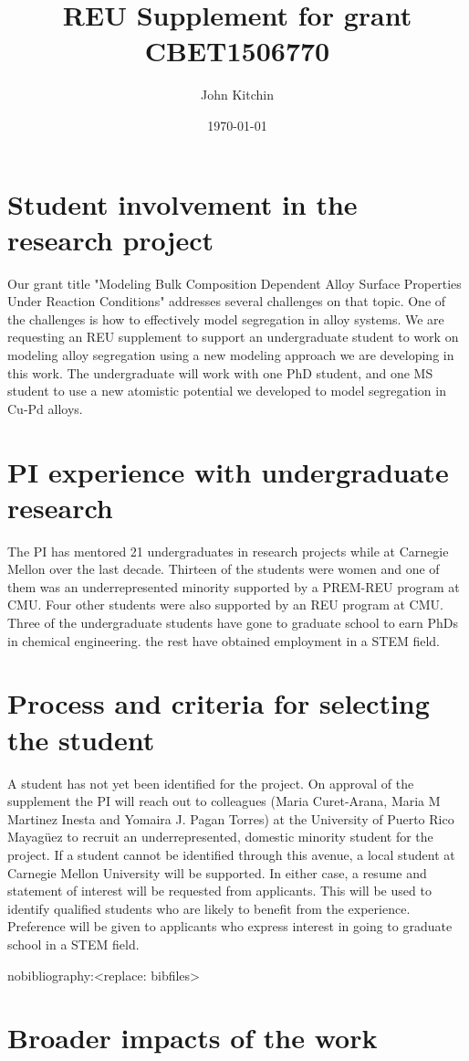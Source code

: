 \documentclass[12pt]{article}
\author{John Kitchin}
\date{\today}
\title{REU Supplement for grant CBET1506770}
\begin{document}
\section{Student involvement in the research project}
\label{sec-1}

Our grant title "Modeling Bulk Composition Dependent Alloy Surface Properties Under Reaction Conditions" addresses several challenges on that topic. One of the challenges is how to effectively model segregation in alloy systems. We are requesting an REU supplement to support an undergraduate student to work on modeling alloy segregation using a new modeling approach we are developing in this work. The undergraduate will work with one PhD student, and one MS student to use a new atomistic potential we developed to model segregation in Cu-Pd alloys.



\section{PI experience with undergraduate research}
\label{sec-2}
The PI has mentored 21 undergraduates in research projects while at Carnegie Mellon over the last decade. Thirteen of the students were women and one of them was an underrepresented minority supported by a PREM-REU program at CMU. Four other students were also supported by an REU program at CMU. Three of the undergraduate students have gone to graduate school to earn PhDs in chemical engineering. the rest have obtained employment in a STEM field.

\section{Process and criteria for selecting the student}
\label{sec-3}

A student has not yet been identified for the project. On approval of the supplement the PI will reach out to colleagues (Maria Curet-Arana, Maria M Martinez Inesta and Yomaira J. Pagan Torres) at the University of Puerto Rico Mayagüez to recruit an underrepresented, domestic minority student for the project. If a student cannot be identified through this avenue, a local student at Carnegie Mellon University will be supported. In either case, a resume and statement of interest will be requested from applicants. This will be used to identify qualified students who are likely to benefit from the experience. Preference will be given to applicants who express interest in going to graduate school in a STEM field.

\newpage


nobibliography:<replace: bibfiles>


\section{Broader impacts of the work}
\label{sec-4}
\end{document}
